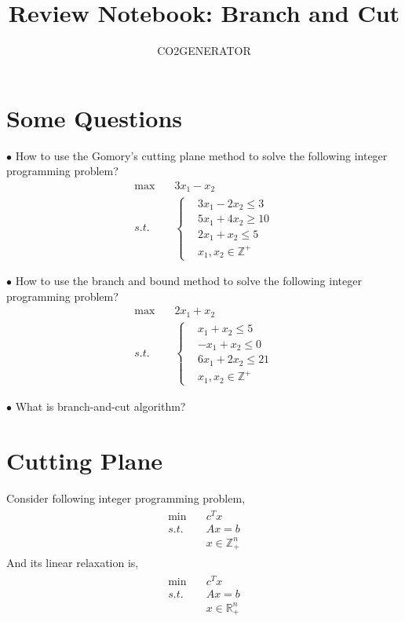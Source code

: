 \documentclass{article}
\title {Review Notebook: Branch and Cut}
\author{CO2GENERATOR}
\begin{document}
\maketitle 
\allowdisplaybreaks[4]

\section{Some Questions}

\noindent $\bullet$ How to use the Gomory's cutting plane method to solve the following integer programming problem?
\begin{align}
	\max \quad & 3x_1 - x_2 \\
	s.t. \quad & \left\{
	\begin{aligned}
		& 3x_1 - 2x_2 \leq 3 \\
		& 5x_1 + 4x_2 \geq 10 \\
		& 2x_1 + x_2 \leq 5 \\
		& x_1, x_2 \in \mathbb{Z}^+
	\end{aligned}\right.
\end{align}

\noindent $\bullet$ How to use the branch and bound method to solve the following integer programming problem?
\begin{align}
	\max \quad & 2x_1 + x_2 \\
	s.t. \quad & \left\{
	\begin{aligned}
		& x_1 + x_2 \leq 5 \\
		& -x_1 + x_2 \leq 0 \\
		& 6x_1 + 2x_2 \leq 21 \\
		& x_1, x_2 \in \mathbb{Z}^+
	\end{aligned}\right.
\end{align}

\noindent $\bullet$ What is branch-and-cut algorithm?

\newpage
\section{Cutting Plane}

Consider following integer programming problem,
\begin{align}
\label{problem:ip}
\begin{aligned}
\min \quad & c^Tx \\
s.t. \quad & Ax = b \\
& x \in \mathbb{Z}_+^n
\end{aligned}
\end{align}
And its linear relaxation is,
\begin{align}
\label{linear-relaxation}
\begin{aligned}
\min \quad & c^Tx \\
s.t. \quad & Ax = b \\
& x \in \mathbb{R}_+^n
\end{aligned}
\end{align}
\end{document}
